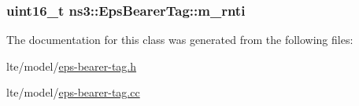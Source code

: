 \subsubsection[{\texorpdfstring{m\+\_\+rnti}{m_rnti}}]{\setlength{\rightskip}{0pt plus 5cm}uint16\+\_\+t ns3\+::\+Eps\+Bearer\+Tag\+::m\+\_\+rnti\hspace{0.3cm}{\ttfamily [private]}}\hypertarget{classns3_1_1EpsBearerTag_a22f1c0bf972caa56ccf216ac805ae22e}{}\label{classns3_1_1EpsBearerTag_a22f1c0bf972caa56ccf216ac805ae22e}


The documentation for this class was generated from the following files\+:\begin{DoxyCompactItemize}
\item 
lte/model/\hyperlink{eps-bearer-tag_8h}{eps-\/bearer-\/tag.\+h}\item 
lte/model/\hyperlink{eps-bearer-tag_8cc}{eps-\/bearer-\/tag.\+cc}\end{DoxyCompactItemize}
